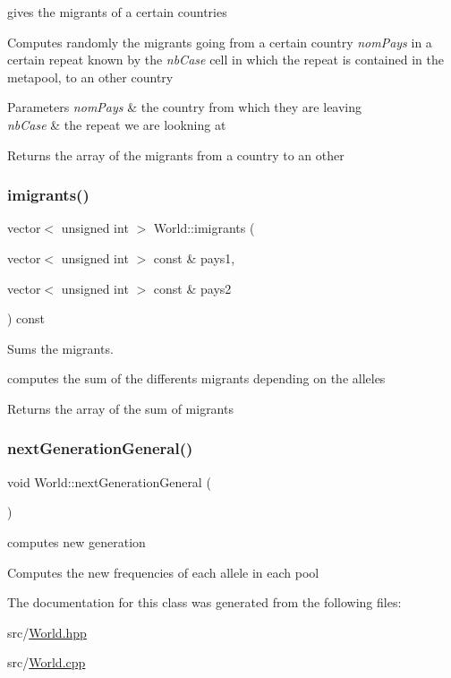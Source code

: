 gives the migrants of a certain countries 

Computes randomly the migrants going from a certain country {\itshape nom\+Pays} in a certain repeat known by the {\itshape nb\+Case} cell in which the repeat is contained in the metapool, to an other country 
\begin{DoxyParams}{Parameters}
{\em nom\+Pays} & the country from which they are leaving \\
\hline
{\em nb\+Case} & the repeat we are lookning at \\
\hline
\end{DoxyParams}
\begin{DoxyReturn}{Returns}
the array of the migrants from a country to an other 
\end{DoxyReturn}
\hypertarget{class_world_a40ce949759360b92a1f6e47224daa2fc}{}\label{class_world_a40ce949759360b92a1f6e47224daa2fc} 
\subsubsection{\texorpdfstring{imigrants()}{imigrants()}}
{\footnotesize\ttfamily vector$<$ unsigned int $>$ World\+::imigrants (\begin{DoxyParamCaption}\item[{vector$<$ unsigned int $>$ const \&}]{pays1,  }\item[{vector$<$ unsigned int $>$ const \&}]{pays2 }\end{DoxyParamCaption}) const}



Sums the migrants. 

computes the sum of the differents migrants depending on the alleles \begin{DoxyReturn}{Returns}
the array of the sum of migrants 
\end{DoxyReturn}
\hypertarget{class_world_ad3fe092969b31b0e9d5094d2135f4033}{}\label{class_world_ad3fe092969b31b0e9d5094d2135f4033} 
\subsubsection{\texorpdfstring{next\+Generation\+General()}{nextGenerationGeneral()}}
{\footnotesize\ttfamily void World\+::next\+Generation\+General (\begin{DoxyParamCaption}{ }\end{DoxyParamCaption})}



computes new generation 

Computes the new frequencies of each allele in each pool 

The documentation for this class was generated from the following files\+:\begin{DoxyCompactItemize}
\item 
src/\hyperlink{_world_8hpp}{World.\+hpp}\item 
src/\hyperlink{_world_8cpp}{World.\+cpp}\end{DoxyCompactItemize}
